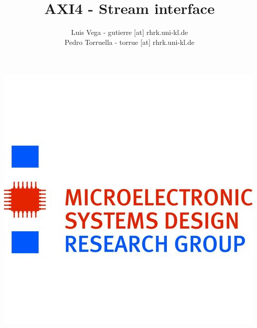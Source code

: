 \documentclass[12pt,a4paper]{article}
\author{Luis Vega - gutierre [at] rhrk.uni-kl.de \\ Pedro Torruella - torrue [at] rhrk.uni-kl.de}
\title{AXI4 - Stream interface}
\begin{document}
\vspace{-40mm}
\maketitle %
\vspace{-10mm}
\begin{center}
\includegraphics[scale=0.5]{images/ohne_titel.jpg}
\end{center}


\setlength\parindent{0pt} %

\renewcommand{\labelenumi}{\alph{enumi}.} %





\end{document}
